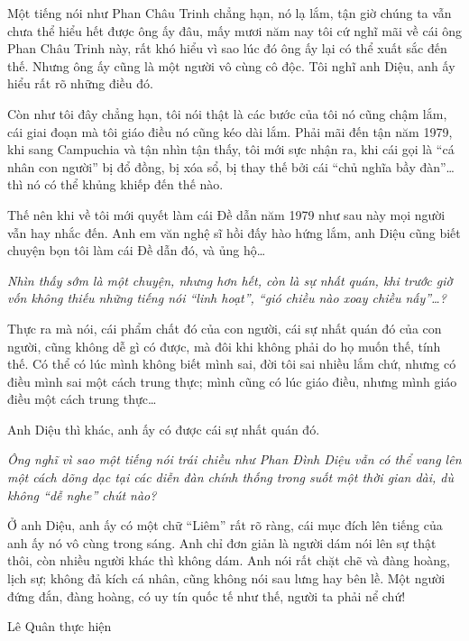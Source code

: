 Một tiếng nói như Phan Châu Trinh chẳng hạn, nó lạ lắm, tận giờ chúng ta vẫn chưa thể hiểu hết được ông ấy đâu, mấy mươi năm nay tôi cứ nghĩ mãi về cái ông Phan Châu Trinh này, rất khó hiểu vì sao lúc đó ông ấy lại có thể xuất sắc đến thế. Nhưng ông ấy cũng là một người vô cùng cô độc. Tôi nghĩ anh Diệu, anh ấy hiểu rất rõ những điều đó.  

Còn như tôi đây chẳng hạn, tôi nói thật là các bước của tôi nó cũng chậm lắm, cái giai đoạn mà tôi giáo điều nó cũng kéo dài lắm. Phải mãi đến tận năm 1979, khi sang Campuchia và tận nhìn tận thấy, tôi mới sực nhận ra, khi cái gọi là “cá nhân con người” bị đổ đồng, bị xóa sổ, bị thay thế bởi cái “chủ nghĩa bầy đàn”… thì nó có thể khủng khiếp đến thế nào.

Thế nên khi về tôi mới quyết làm cái Đề dẫn năm 1979 như sau này mọi người vẫn hay nhắc đến. Anh em văn nghệ sĩ hồi đấy hào hứng lắm, anh Diệu cũng biết chuyện bọn tôi làm cái Đề dẫn đó, và ủng hộ…

\emph{
Nhìn thấy sớm là một chuyện, nhưng hơn hết, còn là sự nhất quán, khi trước giờ vốn không thiếu những tiếng nói “linh hoạt”, “gió chiều nào xoay chiều nấy”…?}

Thực ra mà nói, cái phẩm chất đó của con người, cái sự nhất quán đó của con người, cũng không dễ gì có được, mà đôi khi không phải do họ muốn thế, tính thế. Có thể có lúc mình không biết mình sai, đời tôi sai nhiều lắm chứ, nhưng có điều mình sai một cách trung thực; mình cũng có lúc giáo điều, nhưng mình giáo điều một cách trung thực…

Anh Diệu thì khác, anh ấy có được cái sự nhất quán đó.

\emph{Ông nghĩ vì sao một tiếng nói trái chiều như Phan Đình Diệu vẫn có thể vang lên một cách dõng dạc tại các diễn đàn chính thống trong suốt một thời gian dài, dù không “dễ nghe” chút nào?}

Ở anh Diệu, anh ấy có một chữ “Liêm” rất rõ ràng, cái mục đích lên tiếng của anh ấy nó vô cùng trong sáng. Anh chỉ đơn giản là người dám nói lên sự thật thôi, còn nhiều người khác thì không dám. Anh nói rất chặt chẽ và đàng hoàng, lịch sự; không đả kích cá nhân, cũng không nói sau lưng hay bên lề. Một người đứng đắn, đàng hoàng, có uy tín quốc tế như thế, người ta phải nể chứ! 

Lê Quân thực hiện